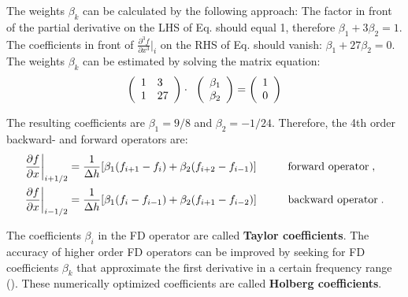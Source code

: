 The weights $\beta_k$ can be calculated by the following approach: 
The factor in front of the partial derivative on the LHS of Eq. %
should equal 1, therefore $\beta_1+3\beta_2=1$. The coefficients in front of $\frac{\partial^3 f}{\partial x^3}\biggr|_i$ on the RHS of Eq. %
should vanish: $\beta_1+27\beta_2=0$. The weights $\beta_k$ can be estimated by solving the matrix equation:
\begin{equation}
    \left(
    \begin{array}{ll}
    1 & 3 \\
    1 & 27 \\
    \end{array}
    \right)\cdot \hspace{0.2 cm}
    \left(
    \begin{array}{l}
    \beta_1 \\
    \beta_2 \\
    \end{array}
    \right)
    =
    \left(
    \begin{array}{l}
    1 \\
    0 \\
    \end{array}
    \right) \notag
\end{equation}

The resulting coefficients are $\beta_1=9/8$ and $\beta_2=-1/24$. Therefore, the 4th order backward- and forward operators are:
\begin{equation}
\begin{split}
    \frac{\partial f}{\partial x}\biggr|_{i+1/2} &= \frac{1}{\Delta h}[\beta_1 (f_{i+1}-f_i)+\beta_2 (f_{i+2}-f_{i-1})] \hspace{1 cm} \text{forward operator}\;,\\
    \frac{\partial f}{\partial x}\biggr|_{i-1/2} &= \frac{1}{\Delta h}[\beta_1 (f_{i}-f_{i-1})+\beta_2 (f_{i+1}-f_{i-2})] \hspace{1 cm} \text{backward operator}\;.
\end{split}
\end{equation}

The coefficients $\beta_i$ in the FD operator are called {\textbf{Taylor coefficients}}. The accuracy of higher order FD operators can be improved by seeking for FD coefficients $\beta_k$ that approximate the first derivative in a certain frequency range (\cite{holberg:87}). 
These numerically optimized coefficients are called {\textbf{Holberg coefficients}}.

